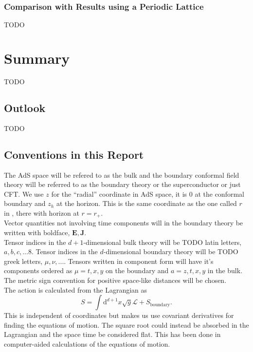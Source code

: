 \documentclass[12pt]{report}
\renewcommand{\d}{\ensuremath{\mathrm{d}}}
\renewcommand{\L}{\ensuremath{\mathcal{L}}}
\begin{document}
\subsection{Comparison with Results using a Periodic Lattice}
TODO
\chapter{Summary}
TODO
\section{Outlook}
TODO
\begin{appendices}
\chapter{Conventions in this Report\label{conventions}}
The AdS space will be refered to as the bulk and the boundary conformal field theory will be referred to as the boundary theory or the superconductor or just CFT. We use $z$ for the ``radial'' coordinate in AdS space, it is 0 at the conformal boundary and $z_h$ at the horizon. This is the same coordinate as the one called $r$ in \cite{hartnoll8}, there with horizon at $r=r_+$.\\
Vector quantities not involving time components will in the boundary theory be written with boldface, $\mathbf{E}, \mathbf{J}$.\\
Tensor indices in the $d+1$-dimensional bulk theory will be TODO latin letters, $a,b,c,...8$. Tensor indices in the $d$-dimensional boundary theory will be TODO greek letters, $\mu,\nu,...$. Tensors written in component form will have it's components ordered as $\mu=t,x,y$ on the boundary and $a=z,t,x,y$ in the bulk.
The metric sign convention for positive space-like distances will be chosen.\\
The action is calculated from the Lagrangian as
\begin{equation}
 S=\int\d^{d+1} x\sqrt{g}\L+S_\mathrm{boundary}.
\end{equation}
This is independent of coordinates but makes us use covariant derivatives for finding the equations of motion. The square root could instead be absorbed in the Lagrangian and the space time be considered flat. This has been done in computer-aided calculations of the equations of motion.

\end{appendices}
\end{document}
